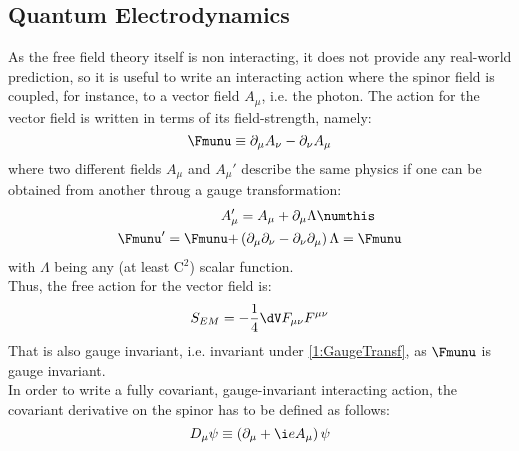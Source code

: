 \subsection{Quantum Electrodynamics}
As the free field theory itself is non interacting, it does not provide any real-world prediction, so it is useful to write an interacting action where the spinor field is coupled, for instance, to a vector field $A_\mu$, i.e. the photon.
The action for the vector field is written in terms of its field-strength, namely:
\begin{equation}
    \Fmunu \equiv \partial_\mu A_\nu - \partial_\nu A_\mu \label{1:FieldStrU1}
\end{equation}
where two different fields $A_\mu$ and $A_\mu'$ describe the same physics if one can be obtained from another throug a gauge transformation:
\begin{align*}
    A_\mu' &= A_\mu + \partial_\mu\Lambda \numthis\label{1:GaugeTransf} \\
    \Fmunu' = \Fmunu + &\left( \partial_\mu\partial_\nu-\partial_\nu\partial_\mu \right)\Lambda = \Fmunu
\end{align*}
with $\Lambda$ being any (at least C$^2$) scalar function.\\
Thus, the free action for the vector field is:
\begin{equation}
    S_{EM} = -\frac14\dV F_{\mu\nu}F^{\mu\nu} \label{1:FreeMaxwellAction}
\end{equation}
That is also gauge invariant, i.e. invariant under \eqref{1:GaugeTransf}, as $\Fmunu$ is gauge invariant.\\
In order to write a fully covariant, gauge-invariant interacting action, the covariant derivative on the spinor has to be defined as follows:
\begin{equation}
    D_\mu\psi \equiv \left( \partial_\mu+\i e A_\mu \right)\psi \label{1:CovDeriv}
\end{equation}

